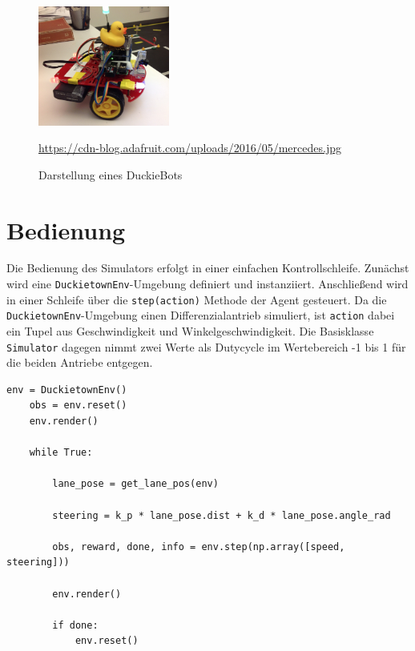 \begin{figure}[H]
	\centering
	\includegraphics[width=0.385\textwidth]{kapitel2/images/duckiebot.jpg}
	\label{fig:duckiebot}
	\caption{Darstellung eines DuckieBots}
	\vspace{0.2cm}
	\quelle\url{https://cdn-blog.adafruit.com/uploads/2016/05/mercedes.jpg}
\end{figure}


\section{Bedienung}

Die Bedienung des Simulators erfolgt in einer einfachen Kontrollschleife. Zunächst wird eine \texttt{DuckietownEnv}-Umgebung definiert und instanziiert. Anschließend wird in einer Schleife über die \texttt{step(action)} Methode der Agent gesteuert. Da die  \texttt{DuckietownEnv}-Umgebung einen Differenzialantrieb simuliert, ist \texttt{action} dabei ein Tupel aus Geschwindigkeit und Winkelgeschwindigkeit. Die Basisklasse \texttt{Simulator} dagegen nimmt zwei Werte als Dutycycle im Wertebereich -1 bis 1 für die beiden Antriebe entgegen.

\begin{minipage}{\linewidth}
	\begin{lstlisting}[caption={Bedienung einer DuckieTown-Umgebung}]
	env = DuckietownEnv()
	obs = env.reset()
	env.render()
	
	while True:
		
		lane_pose = get_lane_pos(env)
		
		steering = k_p * lane_pose.dist + k_d * lane_pose.angle_rad
		
		obs, reward, done, info = env.step(np.array([speed, steering]))
		
		env.render()
		
		if done:
			env.reset()
	
	\end{lstlisting}
\end{minipage}

